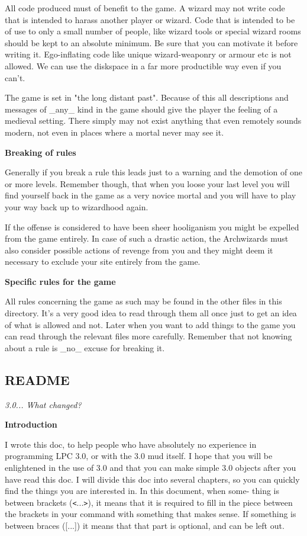 All code produced must of benefit to the game. A wizard may not write
code that is intended to harass another player or wizard. Code that
is intended to be of use to only a small number of people, like wizard
tools or special wizard rooms should be kept to an absolute minimum.
Be sure that you can motivate it before writing it. Ego-inflating code
like unique wizard-weaponry or armour etc is not allowed. We can use
the diskspace in a far more productible way even if you can't.

The game is set in "the long distant past". Because of this all
descriptions and messages of \_any\_ kind in the game should give the
player the feeling of a medieval setting. There simply may not exist
anything that even remotely sounds modern, not even in places where a
mortal never may see it.

{\bf Breaking of rules}

Generally if you break a rule this leads just to a warning and the
demotion of one or more levels. Remember though, that when you loose
your last level you will find yourself back in the game as a very novice
mortal and you will have to play your way back up to wizardhood again.

If the offense is considered to have been sheer hooliganism you might
be expelled from the game entirely. In case of such a drastic action,
the Archwizards must also consider possible actions of revenge from
you and they might deem it necessary to exclude your site entirely
from the game. 

{\bf Specific rules for the game}

All rules concerning the game as such may be found in the other files
in this directory. It's a very good idea to read through them all once
just to get an idea of what is allowed and not. Later when you want to
add things to the game you can read through the relevant files more 
carefully. Remember that not knowing about a rule is \_no\_ excuse for
breaking it.


\subsection{README}

{\em 3.0... What changed?}

{\bf Introduction}

I wrote this doc, to help people who have absolutely no experience in
programming LPC 3.0, or with the 3.0 mud itself. I hope that you will
be enlightened in the use of 3.0 and that you can make simple 3.0
objects after you have read this doc.
   I will divide this doc into several chapters, so you can quickly
find the things you are interested in. In this document, when some-
thing is between brackets (\verb+<+...\verb+>+), it means that it is required to
fill in the piece between the brackets in your command with something
that makes sense. If something is between braces ([...]) it means
that that part is optional, and can be left out.

